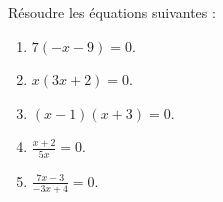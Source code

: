 
\begin{exercice}\label{exosmath-0433}

    Résoudre les équations suivantes :
    \begin{multicols}{3}
        \begin{enumerate}
            \item
                \( 7(-x-9)=0\).
            \item
                \( x(3x+2)=0\).
            \item
                \( (x-1)(x+3)=0\).
            \item
                \( \frac{ x+2 }{ 5x }=0\).
            \item
                \( \frac{ 7x-3 }{ -3x+4 }=0\).
        \end{enumerate}
    \end{multicols}

\end{exercice}
